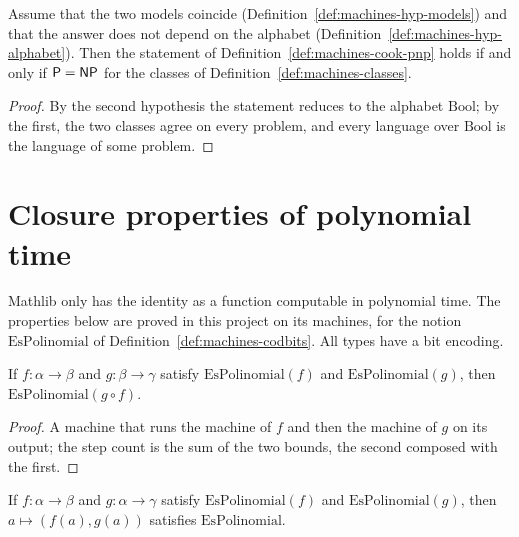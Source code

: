 \begin{theorem}[The two statements of P = NP agree, given two bridge hypotheses]
  \label{thm:machines-cook-iff}
  \leanok
  Assume that the two models coincide (Definition~\ref{def:machines-hyp-models}) and that the answer does
  not depend on the alphabet (Definition~\ref{def:machines-hyp-alphabet}). Then the statement of
  Definition~\ref{def:machines-cook-pnp} holds if and only if $\mathsf{P} = \mathsf{NP}$ for the classes of
  Definition~\ref{def:machines-classes}.
  \own{}
\end{theorem}

\begin{proof}
  \leanok
  By the second hypothesis the statement reduces to the alphabet $\mathrm{Bool}$; by the first, the two
  classes agree on every problem, and every language over $\mathrm{Bool}$ is the language of some problem.
\end{proof}

\section{Closure properties of polynomial time}
\label{sec:machines-closure}

Mathlib only has the identity as a function computable in polynomial time. The properties below are
proved in this project on its machines, for the notion $\mathrm{EsPolinomial}$ of
Definition~\ref{def:machines-codbits}. All types have a bit encoding.

\begin{theorem}
  \label{thm:machines-comp}
  \leanok
  If $f : \alpha \to \beta$ and $g : \beta \to \gamma$ satisfy $\mathrm{EsPolinomial}(f)$ and
  $\mathrm{EsPolinomial}(g)$, then $\mathrm{EsPolinomial}(g \circ f)$.
  \own{}
  \infrastructure{}
\end{theorem}

\begin{proof}
  \leanok
  A machine that runs the machine of $f$ and then the machine of $g$ on its output; the step count is the
  sum of the two bounds, the second composed with the first.
\end{proof}

\begin{theorem}
  \label{thm:machines-pairs}
  \leanok
  If $f : \alpha \to \beta$ and $g : \alpha \to \gamma$ satisfy $\mathrm{EsPolinomial}(f)$ and
  $\mathrm{EsPolinomial}(g)$, then $a \mapsto (f(a), g(a))$ satisfies $\mathrm{EsPolinomial}$.
  \own{}
  \infrastructure{}
\end{theorem}

